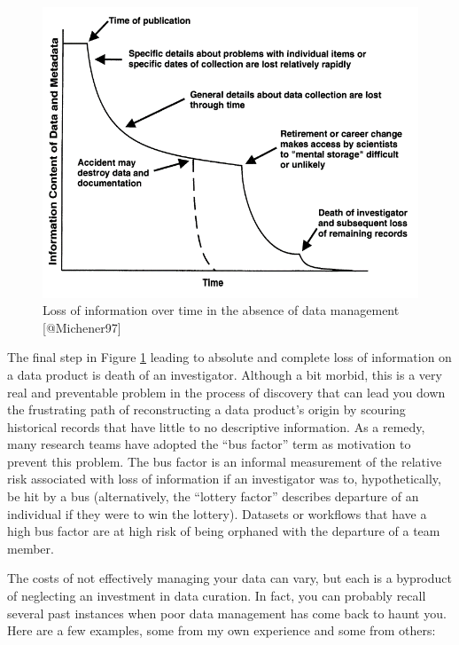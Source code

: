 \documentclass[
]{book}
\begin{document}
\begin{figure}

{\centering \includegraphics[width=1\linewidth]{img/michener} 

}

\caption{Loss of information over time in the absence of data management [@Michener97]}\label{fig:michener}
\end{figure}

The final step in Figure \ref{fig:michener} leading to absolute and complete loss of information on a data product is death of an investigator. Although a bit morbid, this is a very real and preventable problem in the process of discovery that can lead you down the frustrating path of reconstructing a data product's origin by scouring historical records that have little to no descriptive information. As a remedy, many research teams have adopted the ``bus factor'' term as motivation to prevent this problem. The bus factor is an informal measurement of the relative risk associated with loss of information if an investigator was to, hypothetically, be hit by a bus (alternatively, the ``lottery factor'' describes departure of an individual if they were to win the lottery). Datasets or workflows that have a high bus factor are at high risk of being orphaned with the departure of a team member.

The costs of not effectively managing your data can vary, but each is a byproduct of neglecting an investment in data curation. In fact, you can probably recall several past instances when poor data management has come back to haunt you. Here are a few examples, some from my own experience and some from others:
\end{document}
